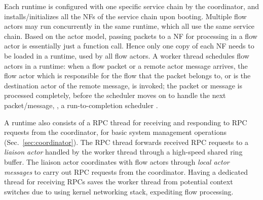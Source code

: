 Each runtime is configured with one specific service chain by the coordinator, and installs/initializes all the NFs of the service chain upon booting. Multiple flow actors may run concurrently in the same runtime, which all use the same service chain.  %
 Based on the actor model, passing packets to a NF for processing in a flow actor is essentially just a function call. Hence only one copy of each NF needs to be loaded in a runtime, used by all flow actors.
 A worker thread schedules flow actors in a runtime: %
  when a flow packet or a remote actor message arrives, the flow actor which is responsible for the flow that the packet belongs to, or is the destination actor of the remote message, is invoked; the packet or message is processed completely, before the scheduler moves on to handle the next packet/message, \ie, a run-to-completion scheduler .


A runtime also consists of a RPC thread for receiving and responding to RPC requests from the coordinator, for basic system management operations (Sec.~\ref{sec:coordinator}). The RPC thread forwards received RPC requests to a {\em liaison actor} handled by the worker thread through a high-speed shared ring buffer.  The liaison actor coordinates with flow actors through {\em local actor messages} to carry out RPC requests from the coordinator. Having a dedicated thread for receiving RPCs saves the worker thread from potential context switches due to using kernel networking stack, expediting flow processing. 

